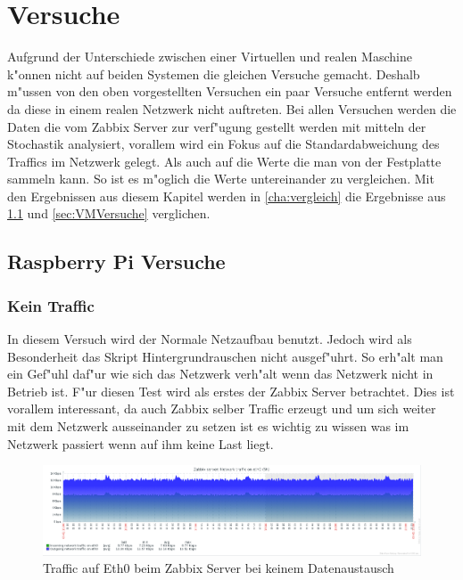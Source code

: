 \chapter{Versuche}
\label{cha:versuche}
Aufgrund der Unterschiede zwischen einer Virtuellen und realen Maschine k"onnen nicht auf beiden Systemen  %
die gleichen Versuche gemacht. Deshalb m"ussen von den oben vorgestellten Versuchen ein paar Versuche entfernt %
werden da diese in einem realen Netzwerk nicht auftreten. Bei allen Versuchen werden die Daten die vom Zabbix Server %
zur verf"ugung gestellt werden mit mitteln der Stochastik analysiert, vorallem wird ein Fokus auf die Standardabweichung des Traffics %
im Netzwerk gelegt. Als auch auf die Werte die man von der Festplatte sammeln kann. %
So ist es m"oglich die Werte untereinander zu vergleichen. Mit den Ergebnissen %
aus diesem Kapitel werden in \cref{cha:vergleich} die Ergebnisse aus \cref{sec:raspberryPiVersuche} und \cref{sec:VMVersuche} verglichen. %

\section{Raspberry Pi Versuche}
\label{sec:raspberryPiVersuche}

\subsection{Kein Traffic}
\label{subsec:nix}
In diesem Versuch wird der Normale Netzaufbau benutzt. Jedoch wird als Besonderheit das Skript Hintergrundrauschen %
nicht ausgef"uhrt. So erh"alt man ein Gef"uhl daf"ur wie sich das Netzwerk verh"alt wenn das Netzwerk nicht in Betrieb %
ist. F"ur diesen Test wird als erstes der Zabbix Server betrachtet. Dies ist vorallem interessant, da auch Zabbix selber %
Traffic erzeugt und um sich weiter mit dem Netzwerk ausseinander zu setzen ist es wichtig zu wissen was im Netzwerk passiert %
wenn auf ihm keine Last liegt. %
 
\begin{figure}[htbp]
\centering
\includegraphics*[width=0.9\linewidth]{Abb/Zabbix/ZabbixNoTraffic/ZabbixNoTrafficEth0}

\caption{Traffic auf Eth0 beim Zabbix Server bei keinem Datenaustausch}
\label{fig:Eth0ServerNoTraffic}
\end{figure}

